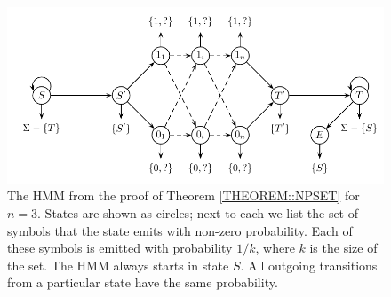 
\begin{figure}
\centerline{\includegraphics[scale=0.68]{../figures/jcss/expandedcliquehmm.pdf}}
\caption[HMM for which set is NP-hard to optimize]{The HMM from the proof of Theorem
  \ref{THEOREM::NPSET} for $n=3$. States are shown as circles; next to each we
  list the set of symbols that the state emits with non-zero
  probability. Each of these symbols is emitted with probability
  $1/k$, where $k$ is the size of the set. The HMM always starts in
  state $S$. All outgoing transitions from a particular state have
  the same probability.}\label{fig:set_hmm2}
\end{figure}

